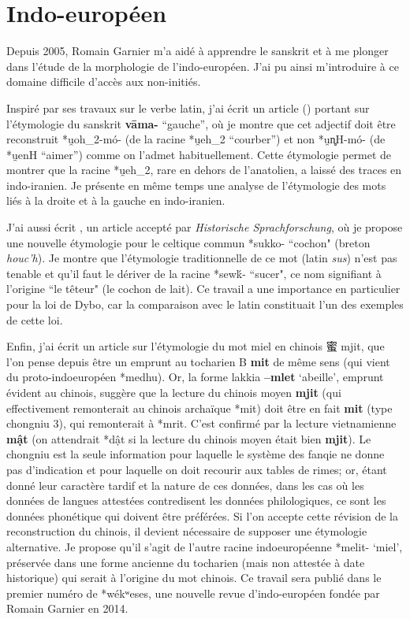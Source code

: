 \documentclass[oldfontcommands,oneside,a4paper,11pt]{memoir}
\newcommand{\ipa}[1]{{\phon\textbf{#1}}}
\newcommand{\zh}[1]{{\cn #1}}
\begin{document}
\section{Indo-européen}
Depuis 2005, Romain Garnier m'a aidé à apprendre le sanskrit et à me plonger dans l'étude de la morphologie de l'indo-européen. J'ai pu ainsi m'introduire à ce domaine difficile d'accès aux non-initiés.

Inspiré par ses travaux  sur le verbe latin, j'ai écrit un article (\citealt{jacques13vama}) portant sur l'étymologie du sanskrit \ipa{vāma-} ``gauche'', où je montre que cet adjectif doit être reconstruit *u̯oh_2-mó- (de la racine *u̯eh_2 ``courber'') et non *u̯n̻H-mó- (de *u̯enH ``aimer'') comme on l'admet habituellement. Cette étymologie permet de montrer que la racine *u̯eh_2, rare en dehors de l'anatolien, a laissé des traces en indo-iranien. Je présente en même temps une analyse de l'étymologie des mots liés à la droite et à la gauche en indo-iranien. 

J'ai aussi écrit \citet{jacques15cochon}, un article accepté par \textit{Historische Sprachforschung}, où je propose une nouvelle étymologie pour le celtique commun *sukko- ``cochon" (breton \textit{houc'h}). Je montre que l'étymologie traditionnelle de ce mot (latin \textit{sus}) n'est pas tenable et qu'il faut le dériver de la racine *sewḱ- ``sucer", ce nom signifiant à l'origine ``le têteur" (le cochon de lait). Ce travail a une importance en particulier pour la loi de Dybo, car la comparaison avec le latin constituait l'un des exemples de cette loi.

Enfin, j'ai écrit un article sur l'étymologie du mot miel en chinois \zh{蜜} mjit, que l'on pense depuis \citealt{polivanov16mit} être un emprunt au tocharien B \ipa{mit} de même sens (qui vient du proto-indoeuropéen *medhu). Or, la forme lakkia \ipa{--mlet} `abeille', emprunt évident au chinois, suggère que la lecture du chinois moyen \ipa{mjit} (qui effectivement remonterait au chinois archaïque *mit) doit être en fait \ipa{mit} (type chongniu 3), qui remonterait à *mrit. C'est confirmé par la lecture vietnamienne \ipa{mật} (on attendrait *dật si la lecture du  chinois moyen était bien \ipa{mjit}). Le chongniu est la seule information pour laquelle le système des fanqie ne donne pas d'indication et pour laquelle on doit recourir aux tables de rimes; or, étant donné leur caractère tardif et la nature de ces données, dans les cas où les données de langues attestées contredisent les données philologiques, ce sont les données phonétique qui doivent être préférées. Si l'on accepte cette révision de la reconstruction du chinois, il devient nécessaire de supposer une étymologie alternative. Je propose qu'il s'agit de l'autre racine indoeuropéenne *melit- `miel', préservée dans une forme ancienne du tocharien (mais non attestée à date historique) qui serait à l'origine du mot chinois. Ce travail sera publié dans le premier numéro de *wékʷeses, une nouvelle revue d'indo-européen fondée par Romain Garnier en 2014.
\end{document}
